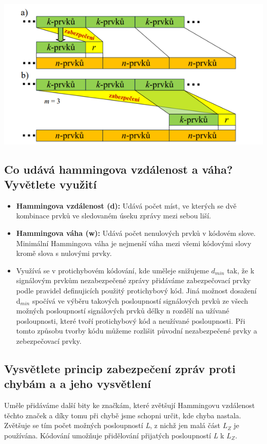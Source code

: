 \includegraphics[]{images/zabezpečování.png}

\subsection{Co udává hammingova vzdálenost a váha? Vyvětlete využití}

\begin{itemize}
    \item \textbf{Hammingova vzdálenost (d):} Udává počet míst, ve kterých se dvě kombinace prvků ve sledovaném úseku zprávy mezi sebou liší.
    

    
    \item \textbf{Hammingova váha (w):} Udává počet nenulových prvků v kódovém slove.
    Minimální Hammingova váha je nejmenší váha mezi všemi kódovými slovy kromě slova s nulovými prvky.
    
    \item Využívá se v protichybovém kódování, kde uměleje snižujeme $d_{min}$ tak, že k signálovým prvkům nezabezpečené zprávy přidáváme zabezpečovací prvky podle pravidel definujicích použitý protichybový kód.
    Jiná možnost dosažení d$_{min}$ spočívá ve výběru takových posloupností signálových prvků ze všech možných posloupností signálových prvků délky n rozdělí na užívané posloupnosti, které tvoří protichybový kód a neužívané posloupnosti.  Při tomto způsobu tvorby kódu můžeme rozlišit původní nezabezpečené prvky a zebezpečovací prvky.
\end{itemize}
\subsection{Vysvětlete princip zabezpečení zpráv proti chybám a a jeho vysvětlení}
Uměle přidáváme další bity ke značkám, které zvětšují Hammingovu vzdálenost těchto značek a díky tomu při chybě jsme schopni určit, kde chyba nastala.
Zvětšuje se tím počet možných posloupností \textit{L}, z nichž jen malá část
$L_Z$ je používána. Kódování umožňuje přidělování přijatých posloupností \textit{L} k $L_Z$.

